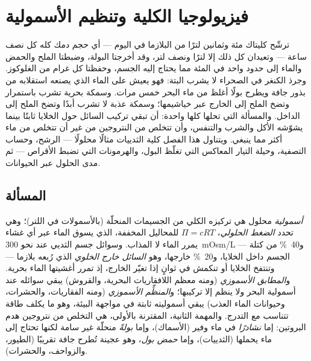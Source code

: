 \chapter{فيزيولوجيا الكلية وتنظيم الأسمولية}\label{ch:b3:renal-osmoregulation}

ترشّح كليتاك مئة وثمانين لترًا من البلازما في اليوم --- أي
حجم دمك كله كل نصف ساعة --- وتعيدان كل ذلك إلا لترًا ونصف
لتر، وقد أخرجتا البولة، وضبطتا الملح والحمض والماء إلى حدود
واحد في المئة مما يحتاج إليه الجسم، وحفظتا كل غرام من
الغلوكوز. وجرذ الكنغر في الصحراء لا يشرب البتة: فهو يعيش على
الماء الذي يصنعه استقلابه من بذور جافة ويطرح بولًا أغلظ من
ماء البحر خمس مرات. وسمكة بحرية تشرب باستمرار وتضخ الملح إلى
الخارج عبر خياشيمها؛ وسمكة عذبة لا تشرب أبدًا وتضخ الملح إلى
الداخل. والمسألة التي تحلها كلها واحدة: أن تبقي تركيب السائل
حول الخلايا ثابتًا بينما يشوّشه الأكل والشرب والتنفس، وأن
تتخلص من النتروجين من غير أن تتخلص من ماء أكثر مما ينبغي.
ويتناول هذا الفصل كلية الثدييات مثالًا محلولًا --- الرشح،
وحساب التصفية، وحيلة التيار المعاكس التي تغلّظ البول،
والهرمونات التي تضبط الأقراص --- ثم مدى الحلول عبر الحيوانات.

\section{المسألة}

\begin{definition}\label{def:b3:renal-osmoregulation:problem}
\emph{أسمولية} محلول هي تركيزه الكلي من الجسيمات المنحلّة
(بالأسمولات في اللتر)؛ وهي تحدد \emph{الضغط الحلولي}،
$\Pi = cRT$ للمحاليل المخففة، الذي يسوق الماء عبر أي غشاء
يمرر الماء لا المذاب. وسوائل جسم الثديي عند نحو
\qty{300}{mOsm/L} --- و\qty{40}{\%} من كتلة الجسم داخل
الخلايا، و\qty{20}{\%} خارجها، وهو \emph{السائل خارج الخلوي}
الذي رُبعه بلازما --- وتنتفخ الخلايا أو تنكمش في ثوانٍ إذا
تغيّر الخارج، إذ تمرر أغشيتها الماء بحرية. و\emph{المطابق
الأسموزي} (ومنه معظم اللافقاريات البحرية، والقروش) يبقي
سوائله عند أسمولية البحر ولا ينظم إلا تركيبها؛ و\emph{المنظِّم
الأسموزي} (ومنه الفقاريات، والحشرات، وحيوانات الماء العذب)
يبقي أسموليته ثابتة في مواجهة البيئة، وهو ما يكلف طاقة
تتناسب مع التدرج. والمهمة الثانية، المقترنة بالأولى، هي
التخلص من نتروجين هدم البروتين: إما \emph{نشادرًا} في ماء
وفير (الأسماك)، وإما \emph{بولةً} منحلّة غير سامة لكنها تحتاج
إلى ماء يحملها (الثدييات)، وإما \emph{حمض بول}، وهو عجينة
تُطرح جافة تقريبًا (الطيور، والزواحف، والحشرات).
\end{definition}

